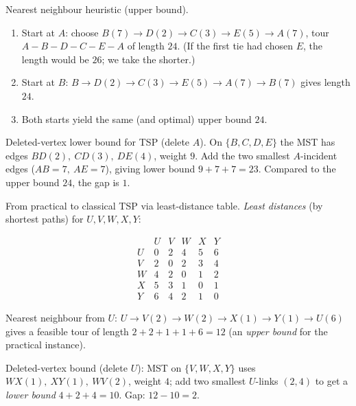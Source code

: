 \documentclass[11pt]{article}
\def\textbf#1{#1}%
\begin{document}
\begin{solution}
\textbf{Nearest neighbour heuristic (upper bound).}
\begin{enumerate}
  \item Start at $A$: choose $B(7)\to D(2)\to C(3)\to E(5)\to A(7)$, tour $A\!-\!B\!-\!D\!-\!C\!-\!E\!-\!A$ of length $24$.
        (If the first tie had chosen $E$, the length would be $26$; we take the shorter.)
  \item Start at $B$: $B\!\to\!D(2)\!\to\!C(3)\!\to\!E(5)\!\to\!A(7)\!\to\!B(7)$ gives length $24$.
  \item Both starts yield the same (and optimal) upper bound $24$.
\end{enumerate}
\end{solution}

\begin{solution}
\textbf{Deleted-vertex lower bound for TSP (delete $A$).}
On $\{B,C,D,E\}$ the MST has edges $BD(2),\ CD(3),\ DE(4)$, weight $9$.
Add the two smallest $A$-incident edges ($AB=7,\ AE=7$), giving lower bound $9+7+7=23$.
Compared to the upper bound $24$, the gap is $1$.
\end{solution}

\begin{solution}
\textbf{From practical to classical TSP via least-distance table.}
\emph{Least distances} (by shortest paths) for $U,V,W,X,Y$:

\[
\begin{array}{c|ccccc}
   & U & V & W & X & Y\\\hline
U & 0 & 2 & 4 & 5 & 6\\
V & 2 & 0 & 2 & 3 & 4\\
W & 4 & 2 & 0 & 1 & 2\\
X & 5 & 3 & 1 & 0 & 1\\
Y & 6 & 4 & 2 & 1 & 0
\end{array}
\]

Nearest neighbour from $U$: $U\!\to\!V(2)\!\to\!W(2)\!\to\!X(1)\!\to\!Y(1)\!\to\!U(6)$ gives a feasible tour of length $2+2+1+1+6=12$ (an \emph{upper bound} for the practical instance).

Deleted-vertex bound (delete $U$): MST on $\{V,W,X,Y\}$ uses $WX(1),\ XY(1),\ WV(2)$, weight $4$; add two smallest $U$-links $(2,4)$ to get a \emph{lower bound} $4+2+4=10$. Gap: $12-10=2$.
\end{solution}
\end{document}
